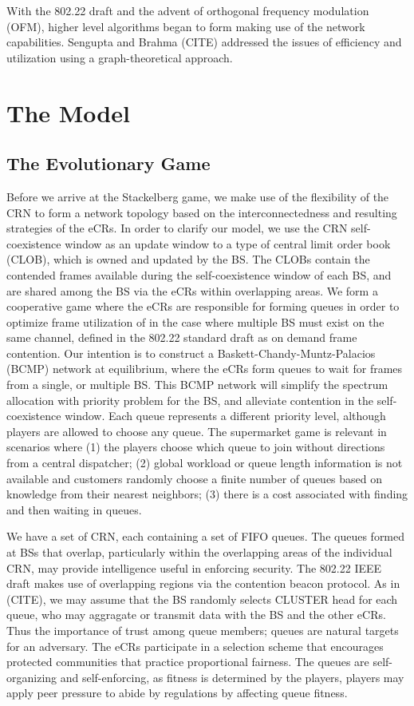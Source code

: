 \documentclass[10pt]{article}
\theoremstyle{definition}
\begin{document}
With the 802.22 draft and the advent of orthogonal frequency modulation (OFM),
higher level algorithms began to form making use of the network capabilities.
Sengupta and Brahma (CITE) addressed the issues of efficiency and utilization
using a graph-theoretical approach. 


\section{The Model}

\subsection{The Evolutionary Game}

Before we arrive at the Stackelberg game, we make use of the flexibility of the
CRN to form a network topology based on the interconnectedness and resulting
strategies of the eCRs. In order to clarify our model, we use the CRN 
self-coexistence window as an update window to
a type of central limit order book (CLOB), which is owned and updated by the BS. 
The CLOBs contain the contended frames available during the self-coexistence window 
of each BS, and are shared among the BS via the eCRs within overlapping
areas. We form a cooperative game where the eCRs are responsible for forming queues in order
to optimize frame utilization of in the case where multiple BS must exist on the
same channel, defined in the 802.22 standard draft as on demand frame
contention. Our intention is to construct a
Baskett-Chandy-Muntz-Palacios (BCMP) network at equilibrium, where the eCRs form
queues to wait for frames from a single, or multiple BS. This BCMP network will simplify the spectrum allocation
with priority
problem for the BS, and alleviate contention in the self-coexistence window.
Each queue represents a different priority level, although players are allowed to choose any queue.
The supermarket game is relevant in scenarios where (1) the players choose which
queue to join without directions from a central dispatcher; (2) global workload or
queue length information is not available and customers randomly choose a finite
number of queues based on knowledge from their nearest neighbors; (3) there is a cost
associated with finding and then waiting in queues.

We have a set of CRN, each containing a set of FIFO queues. 
The queues formed at BSs that overlap, particularly within the overlapping areas 
of the individual CRN, may provide intelligence useful in enforcing
security. The 802.22 IEEE draft makes use of overlapping regions via the
contention beacon protocol. As in (CITE), we may assume that the BS randomly
selects CLUSTER head for each queue, who may aggragate or transmit data with
the BS and the other eCRs. Thus the importance of trust among queue members;
queues are natural targets for an adversary. 
The eCRs participate in a selection scheme that
encourages protected communities that practice proportional fairness. The queues
are self-organizing and
self-enforcing, as fitness is determined by the players,  players may apply peer
pressure to abide by regulations by affecting queue fitness.
\end{document}
